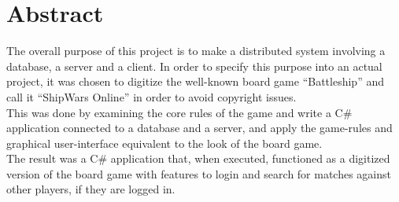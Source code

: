 
\section{Abstract}

The overall purpose of this project is to make a distributed system involving
 a database, a server and a client. In order to specify this purpose into an
  actual project, it was chosen to digitize the well-known board game
   “Battleship” and call it “ShipWars Online” in order to avoid copyright
    issues. \\
This was done by examining the core rules of the game and write
 a C{\#} application connected to a database and a server, and apply
  the game-rules and graphical user-interface equivalent to the look
   of the board game.\\
The result was a C{\#} application that, when executed, functioned as
 a digitized version of the board game with features to login and search
  for matches against other players, if they are logged in.
